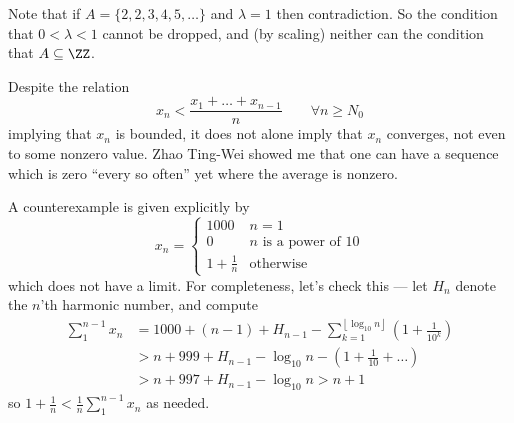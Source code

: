 \documentclass[11pt]{scrartcl}
\begin{document}
\begin{remark*}
Note that if $A = \{2,2,3,4,5,\dots\}$ and $\lambda = 1$ then contradiction.
So the condition that $0 < \lambda < 1$ cannot be dropped,
and (by scaling) neither can the condition that $A \subseteq \ZZ$.
\end{remark*}

\begin{remark*}
  Despite the relation
  \[ x_{n} < \frac{x_1 + \dots + x_{n-1}}{n}
    \qquad \forall n \ge N_0 \]
  implying that $x_n$ is bounded,
  it does not alone imply that $x_n$ converges,
  not even to some nonzero value.
  Zhao Ting-Wei showed me that one can have a sequence which is zero
  ``every so often'' yet where the average is nonzero.

  A counterexample is given explicitly by
  \[
    x_n
    = \begin{cases}
      1000 & n = 1 \\
      0 & n \text{ is a power of $10$} \\
      1 + \frac 1n & \text{otherwise}
    \end{cases}
  \]
  which does not have a limit.
  For completeness, let's check this ---
  let $H_n$ denote the $n$'th harmonic number, and compute
  \begin{align*}
    \sum_1^{n-1} x_n
    &= 1000 + (n-1) + H_{n-1} - \sum_{k=1}^{\left\lfloor \log_{10} n \right\rfloor} \left( 1 + \frac{1}{10^k} \right) \\
    &> n + 999 + H_{n-1} - \log_{10} n - \left( 1 + \frac{1}{10} + \dots \right) \\
    &> n + 997 + H_{n-1} - \log_{10} n > n + 1
  \end{align*}
  so $1 + \frac 1n < \frac 1n \sum_1^{n-1} x_n$ as needed.
\end{remark*}
\pagebreak
\end{document}
